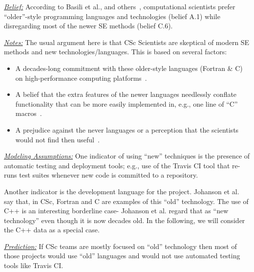 \documentclass[conference,10pt]{IEEEtran}
\begin{document}

\noindent \textit{\underline{Belief:}} According to Basili et al., and others~\cite{basili08_hpc, carver07_environment, Prabhu11_cssurvey, kendall05_C, ragan14_pythoncs},
computational scientists prefer
``older''-style programming languages and technologies (belief A.1) while disregarding most of the newer SE methods (belief C.6).

\noindent \textit{\underline{Notes:}} The usual argument here is that CSc Scientists are skeptical of modern SE methods and new technologies/languages.
This is based on several factors: 
\begin{itemize}
  \item A decades-long commitment with these older-style languages (Fortran \& C) on high-performance computing platforms~\cite{faulk09_secs}.
  \item A belief that the extra features of the newer languages needlessly conflate functionality that can be more easily implemented in, e.g., one line of ``C'' macros~\cite{sanders08_risk}. 
  \item A prejudice against the never languages or a perception that the scientists would not find then useful~\cite{Prabhu11_cssurvey}. 
\end{itemize}



\noindent \textit{\underline{Modeling Assumptions:}} 
One indicator of using ``new'' techniques is the presence of automatic testing and deployment tools; e.g., use of the Travis CI tool that re-runs test suites whenever new code is committed to a repository. 

Another indicator is the development language for the project. 
Johanson et al.~\cite{johan18_secs} say that, in CSc, Fortran and C are examples of this ``old'' technology. The use of C++ is an interesting borderline case- Johanson et al. regard that as ``new technology'' even though it is now decades old. In the following, we will consider the C++ data as a special case.




\noindent \textit{\underline{Prediction:}} If CSc teams are mostly focused on ``old'' technology then most of those projects would use ``old'' languages and would not use automated testing
tools like  Travis CI.
\end{document}
